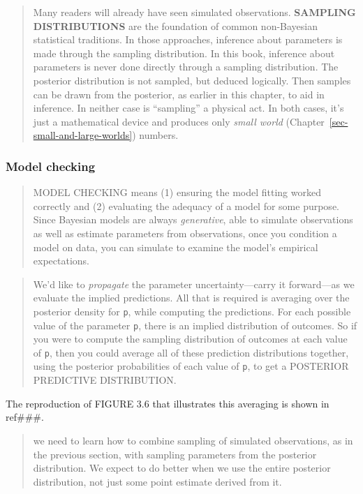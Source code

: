 \documentclass[
  letterpaper,
  DIV=11,
  numbers=noendperiod]{scrreprt}
\begin{document}
\begin{quote}
Many readers will already have seen simulated observations.
\textbf{SAMPLING DISTRIBUTIONS} are the foundation of common
non-Bayesian statistical traditions. In those approaches, inference
about parameters is made through the sampling distribution. In this
book, inference about parameters is never done directly through a
sampling distribution. The posterior distribution is not sampled, but
deduced logically. Then samples can be drawn from the posterior, as
earlier in this chapter, to aid in inference. In neither case is
``sampling'' a physical act. In both cases, it's just a mathematical
device and produces only \emph{small world}
(Chapter~\ref{sec-small-and-large-worlds}) numbers.
\end{quote}

\hypertarget{model-checking}{%
\subsubsection{Model checking}\label{model-checking}}

\begin{quote}
MODEL CHECKING means (1) ensuring the model fitting worked correctly and
(2) evaluating the adequacy of a model for some purpose. Since Bayesian
models are always \emph{generative}, able to simulate observations as
well as estimate parameters from observations, once you condition a
model on data, you can simulate to examine the model's empirical
expectations.
\end{quote}

\begin{quote}
We'd like to \emph{propagate} the parameter uncertainty---carry it
forward---as we evaluate the implied predictions. All that is required
is averaging over the posterior density for \texttt{p}, while computing
the predictions. For each possible value of the parameter \texttt{p},
there is an implied distribution of outcomes. So if you were to compute
the sampling distribution of outcomes at each value of \texttt{p}, then
you could average all of these prediction distributions together, using
the posterior probabilities of each value of \texttt{p}, to get a
POSTERIOR PREDICTIVE DISTRIBUTION.
\end{quote}

The reproduction of FIGURE 3.6 that illustrates this averaging is shown
in ref\#\#\#.

\begin{quote}
we need to learn how to combine sampling of simulated observations, as
in the previous section, with sampling parameters from the posterior
distribution. We expect to do better when we use the entire posterior
distribution, not just some point estimate derived from it.
\end{quote}
\end{document}
